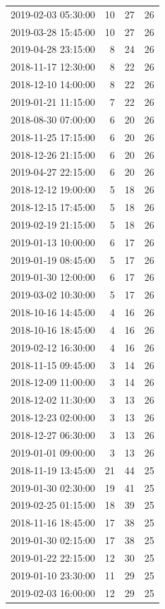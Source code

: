 \begin{tabular}{lrrr}
2019-02-03 05:30:00 & 10 & 27 & 26 \\
2019-03-28 15:45:00 & 10 & 27 & 26 \\
2019-04-28 23:15:00 & 8 & 24 & 26 \\
2018-11-17 12:30:00 & 8 & 22 & 26 \\
2018-12-10 14:00:00 & 8 & 22 & 26 \\
2019-01-21 11:15:00 & 7 & 22 & 26 \\
2018-08-30 07:00:00 & 6 & 20 & 26 \\
2018-11-25 17:15:00 & 6 & 20 & 26 \\
2018-12-26 21:15:00 & 6 & 20 & 26 \\
2019-04-27 22:15:00 & 6 & 20 & 26 \\
2018-12-12 19:00:00 & 5 & 18 & 26 \\
2018-12-15 17:45:00 & 5 & 18 & 26 \\
2019-02-19 21:15:00 & 5 & 18 & 26 \\
2019-01-13 10:00:00 & 6 & 17 & 26 \\
2019-01-19 08:45:00 & 5 & 17 & 26 \\
2019-01-30 12:00:00 & 6 & 17 & 26 \\
2019-03-02 10:30:00 & 5 & 17 & 26 \\
2018-10-16 14:45:00 & 4 & 16 & 26 \\
2018-10-16 18:45:00 & 4 & 16 & 26 \\
2019-02-12 16:30:00 & 4 & 16 & 26 \\
2018-11-15 09:45:00 & 3 & 14 & 26 \\
2018-12-09 11:00:00 & 3 & 14 & 26 \\
2018-12-02 11:30:00 & 3 & 13 & 26 \\
2018-12-23 02:00:00 & 3 & 13 & 26 \\
2018-12-27 06:30:00 & 3 & 13 & 26 \\
2019-01-01 09:00:00 & 3 & 13 & 26 \\
2018-11-19 13:45:00 & 21 & 44 & 25 \\
2019-01-30 02:30:00 & 19 & 41 & 25 \\
2019-02-25 01:15:00 & 18 & 39 & 25 \\
2018-11-16 18:45:00 & 17 & 38 & 25 \\
2019-01-30 02:15:00 & 17 & 38 & 25 \\
2019-01-22 22:15:00 & 12 & 30 & 25 \\
2019-01-10 23:30:00 & 11 & 29 & 25 \\
2019-02-03 16:00:00 & 12 & 29 & 25 \\

\end{tabular}
